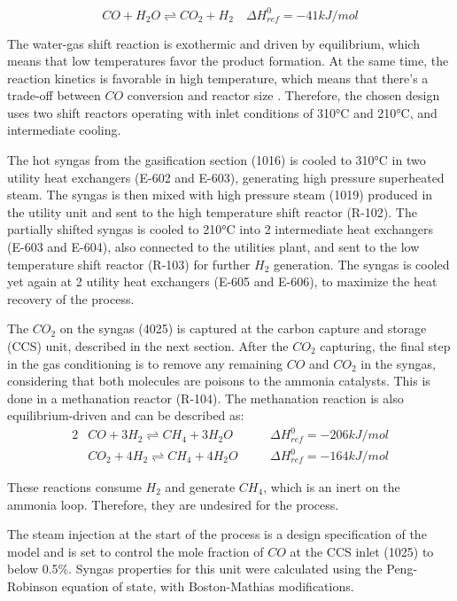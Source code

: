 \documentclass[a4paper, titlepage]{article}
\begin{document}
\begin{equation}
	CO + H_2O \rightleftharpoons CO_2 + H_2 \quad \Delta H_{ref}^0 = -41 kJ/mol
\end{equation}

The water-gas shift reaction is exothermic and driven by equilibrium, which means that low temperatures favor the
product formation. At the same time, the reaction kinetics is favorable in high temperature, which means that there's 
a trade-off between $CO$ conversion and reactor size \cite{florez-orregoProcessSynthesisOptimization2018}. Therefore, 
the chosen design uses two shift reactors operating with inlet conditions of 310°C and 210°C, and intermediate cooling.

The hot syngas from the gasification section (1016) is cooled to 310°C in two utility heat exchangers
(E-602 and E-603), generating high pressure superheated steam. The syngas is then mixed with high pressure steam 
(1019) produced in the utility unit and sent to the high temperature shift reactor (R-102). The partially shifted 
syngas is cooled to 210°C into 2 intermediate heat exchangers (E-603 and E-604), also connected to the utilities 
plant, and sent to the low temperature shift reactor (R-103) for further $H_2$ generation. The syngas is cooled yet 
again at 2 utility heat exchangers (E-605 and E-606), to maximize the heat recovery of the process.

The $CO_2$ on the syngas (4025) is captured at the carbon capture and storage (CCS) unit, described in the next 
section. After the $CO_2$ capturing, the final step in the gas conditioning is to remove any remaining $CO$ and $CO_2$
in the syngas, considering that both molecules are poisons to the ammonia catalysts. This is done in a methanation 
reactor (R-104). The methanation reaction is also equilibrium-driven and can be described as:
\begin{alignat}{2}
	&CO + 3H_2 \rightleftharpoons CH_4 + 3H_2O \quad & &\Delta H_{ref}^0 = -206 kJ/mol \\
	&CO_2 + 4H_2 \rightleftharpoons CH_4 + 4H_2O \quad & &\Delta H_{ref}^0 = -164 kJ/mol
\end{alignat}


These reactions consume $H_2$ and generate $CH_4$, which is an inert on the ammonia loop. Therefore, they are undesired 
for the process.

The steam injection at the start of the process is a design specification of the model and is set to control the mole
fraction of $CO$ at the CCS inlet (1025) to below 0.5\%. Syngas properties for this unit were calculated using 
the Peng-Robinson equation of state, with Boston-Mathias modifications.
\end{document}
